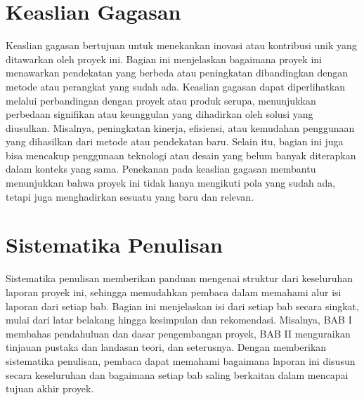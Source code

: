\section{Keaslian Gagasan}
Keaslian gagasan bertujuan untuk menekankan inovasi atau kontribusi unik yang ditawarkan oleh proyek ini. Bagian ini menjelaskan bagaimana proyek ini menawarkan pendekatan yang berbeda atau peningkatan dibandingkan dengan metode atau perangkat yang sudah ada. Keaslian gagasan dapat diperlihatkan melalui perbandingan dengan proyek atau produk serupa, menunjukkan perbedaan signifikan atau keunggulan yang dihadirkan oleh solusi yang diusulkan. Misalnya, peningkatan kinerja, efisiensi, atau kemudahan penggunaan yang dihasilkan dari metode atau pendekatan baru. Selain itu, bagian ini juga bisa mencakup penggunaan teknologi atau desain yang belum banyak diterapkan dalam konteks yang sama. Penekanan pada keaslian gagasan membantu menunjukkan bahwa proyek ini tidak hanya mengikuti pola yang sudah ada, tetapi juga menghadirkan sesuatu yang baru dan relevan.

\section{Sistematika Penulisan}
Sistematika penulisan memberikan panduan mengenai struktur dari keseluruhan laporan proyek ini, sehingga memudahkan pembaca dalam memahami alur isi laporan dari setiap bab. Bagian ini menjelaskan isi dari setiap bab secara singkat, mulai dari latar belakang hingga kesimpulan dan rekomendasi. Misalnya, BAB I membahas pendahuluan dan dasar pengembangan proyek, BAB II menguraikan tinjauan pustaka dan landasan teori, dan seterusnya. Dengan memberikan sistematika penulisan, pembaca dapat memahami bagaimana laporan ini disusun secara keseluruhan dan bagaimana setiap bab saling berkaitan dalam mencapai tujuan akhir proyek.